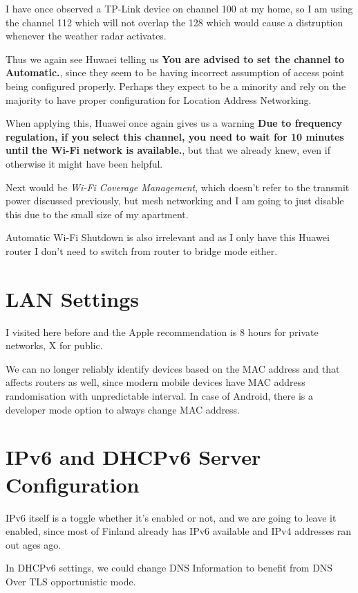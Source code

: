 \documentclass[../wifi-security.tex]{subfiles}
\begin{document}
I have once observed a TP-Link device on channel 100 at my home, so I am using the channel 112 which will not overlap the 128 which would cause a distruption whenever the weather radar activates.

Thus we again see Huwaei telling us \textbf{You are advised to set the channel to Automatic.}, since they seem to be having incorrect assumption of access point being configured properly. Perhaps they expect to be a minority and rely on the majority to have proper configuration for Location Address Networking.

When applying this, Huawei once again gives us a warning \textbf{Due to frequency regulation, if you select this channel, you need to wait for 10 minutes until the Wi-Fi network is available.}, but that we already knew, even if otherwise it might have been helpful.

Next would be \textit{Wi-Fi Coverage Management}, which doesn't refer to the transmit power discussed previously, but mesh networking and I am going to just disable this due to the small size of my apartment.

Automatic Wi-Fi Shutdown is also irrelevant and as I only have this Huawei router I don't need to switch from router to bridge mode either.

\section{LAN Settings}

I visited here before and the Apple recommendation is 8 hours for private networks, X for public.

We can no longer reliably identify devices based on the MAC address and that affects routers as well, since modern mobile devices have MAC address randomisation with unpredictable interval. In case of Android, there is a developer mode option to always change MAC address.

\section{IPv6 and DHCPv6 Server Configuration}

IPv6 itself is a toggle whether it's enabled or not, and we are going to leave it enabled, since most of Finland already has IPv6 available and IPv4 addresses ran out ages ago.

In DHCPv6 settings, we could change DNS Information to benefit from DNS Over TLS opportunistic mode. %
\end{document}
